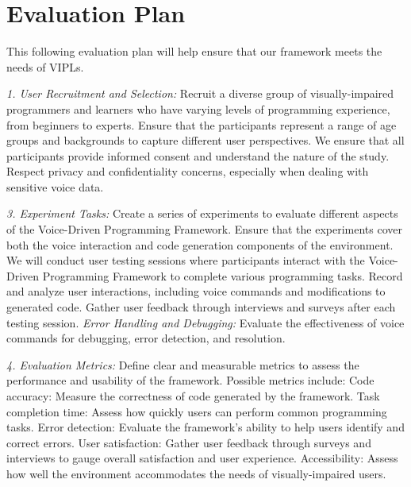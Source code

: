 \section{Evaluation Plan}
\label{eval}





This following evaluation plan will help ensure that our framework meets
the needs of VIPLs.


{\em 1. User Recruitment and Selection:} Recruit a diverse group of
visually-impaired programmers and learners who have varying levels of
programming experience, from beginners to experts.  Ensure that the
participants represent a range of age groups and backgrounds to
capture different user perspectives. We ensure that all participants
provide informed consent and understand the nature of the study.
Respect privacy and confidentiality concerns, especially when dealing
with sensitive voice data.

{\em 3. Experiment Tasks:} Create a series of experiments to evaluate
different aspects of the Voice-Driven Programming Framework.  Ensure
that the experiments cover both the voice interaction and code
generation components of the environment. We will conduct user testing
sessions where participants interact with the Voice-Driven Programming
Framework to complete various programming tasks.  Record and analyze
user interactions, including voice commands and modifications to
generated code.  Gather user feedback through interviews and surveys
after each testing session. {\em Error Handling and Debugging:}
Evaluate the effectiveness of voice commands for debugging, error
detection, and resolution.

{\em 4. Evaluation Metrics:} Define clear and measurable metrics to
assess the performance and usability of the framework. Possible
metrics include: Code accuracy: Measure the correctness of code
generated by the framework.  Task completion time: Assess how quickly
users can perform common programming tasks.  Error detection: Evaluate
the framework's ability to help users identify and correct errors.
User satisfaction: Gather user feedback through surveys and interviews
to gauge overall satisfaction and user experience.  Accessibility:
Assess how well the environment accommodates the needs of
visually-impaired users.

